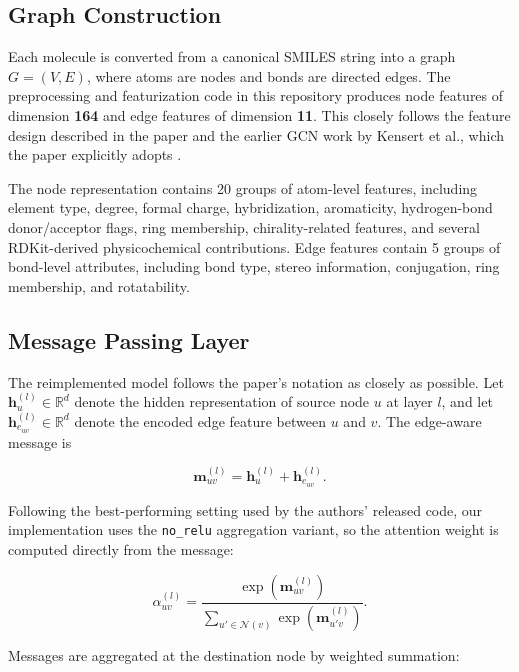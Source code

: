 \subsection{Graph Construction}

Each molecule is converted from a canonical SMILES string into a graph
\(
G = (V, E)
\),
where atoms are nodes and bonds are directed edges. The preprocessing and featurization code in this repository produces node features of dimension \textbf{164} and edge features of dimension \textbf{11}. This closely follows the feature design described in the paper and the earlier GCN work by Kensert et al., which the paper explicitly adopts \cite{kang2023deepgcnrt}.

The node representation contains 20 groups of atom-level features, including element type, degree, formal charge, hybridization, aromaticity, hydrogen-bond donor/acceptor flags, ring membership, chirality-related features, and several RDKit-derived physicochemical contributions. Edge features contain 5 groups of bond-level attributes, including bond type, stereo information, conjugation, ring membership, and rotatability.

\subsection{Message Passing Layer}

The reimplemented model follows the paper's notation as closely as possible. Let
\(
\mathbf{h}^{(l)}_u \in \mathbb{R}^d
\)
denote the hidden representation of source node \(u\) at layer \(l\), and let
\(
\mathbf{h}^{(l)}_{e_{uv}} \in \mathbb{R}^d
\)
denote the encoded edge feature between \(u\) and \(v\). The edge-aware message is

\begin{equation}
\mathbf{m}^{(l)}_{uv} = \mathbf{h}^{(l)}_u + \mathbf{h}^{(l)}_{e_{uv}} .
\end{equation}

Following the best-performing setting used by the authors' released code, our implementation uses the \texttt{no\_relu} aggregation variant, so the attention weight is computed directly from the message:

\begin{equation}
\alpha^{(l)}_{uv} =
\frac{\exp \left( \mathbf{m}^{(l)}_{uv} \right)}
{\sum\limits_{u' \in \mathcal{N}(v)} \exp \left( \mathbf{m}^{(l)}_{u'v} \right)} .
\end{equation}

Messages are aggregated at the destination node by weighted summation:


